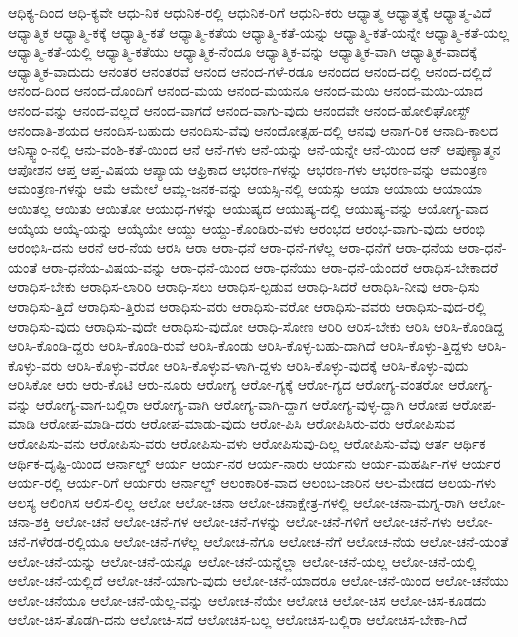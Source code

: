 {ಆಧಿಕ್ಯ-ದಿಂದ
ಆಧಿ-ಕ್ಯವೇ
ಆಧು-ನಿಕ
ಆಧುನಿಕ-ರಲ್ಲಿ
ಆಧುನಿಕ-ರಿಗೆ
ಆಧುನಿ-ಕರು
ಆಧ್ಯಾತ್ಮ
ಆಧ್ಯಾತ್ಮಕ್ಕೆ
ಆಧ್ಯಾತ್ಮ-ವಿದೆ
ಆಧ್ಯಾತ್ಮಿಕ
ಆಧ್ಯಾತ್ಮಿ-ಕಕ್ಕೆ
ಆಧ್ಯಾತ್ಮಿ-ಕತೆ
ಆಧ್ಯಾತ್ಮಿ-ಕತೆಯ
ಆಧ್ಯಾತ್ಮಿ-ಕತೆ-ಯನ್ನು
ಆಧ್ಯಾತ್ಮಿ-ಕತೆ-ಯನ್ನೇ
ಆಧ್ಯಾತ್ಮಿ-ಕತೆ-ಯಲ್ಲ
ಆಧ್ಯಾತ್ಮಿ-ಕತೆ-ಯಲ್ಲಿ
ಆಧ್ಯಾತ್ಮಿ-ಕತೆಯು
ಆಧ್ಯಾತ್ಮಿಕ-ನೆಂದೂ
ಆಧ್ಯಾತ್ಮಿಕ-ವನ್ನು
ಆಧ್ಯಾತ್ಮಿಕ-ವಾಗಿ
ಆಧ್ಯಾತ್ಮಿಕ-ವಾದಕ್ಕೆ
ಆಧ್ಯಾತ್ಮಿಕ-ವಾದುದು
ಆನಂತರ
ಆನಂತರವೆ
ಆನಂದ
ಆನಂದ-ಗಳೆ-ರಡೂ
ಆನಂದದ
ಆನಂದ-ದಲ್ಲಿ
ಆನಂದ-ದಲ್ಲಿದೆ
ಆನಂದ-ದಿಂದ
ಆನಂದ-ದೊಂದಿಗೆ
ಆನಂದ-ಮಯ
ಆನಂದ-ಮಯನೂ
ಆನಂದ-ಮಯಿ
ಆನಂದ-ಮಯಿ-ಯಾದ
ಆನಂದ-ವನ್ನು
ಆನಂದ-ವಲ್ಲದೆ
ಆನಂದ-ವಾಗದೆ
ಆನಂದ-ವಾಗು-ವುದು
ಆನಂದವೇ
ಆನಂದ-ಹೋಲಿಘೋಸ್ಟ್
ಆನಂದಾತಿ-ಶಯದ
ಆನಂದಿಸ-ಬಹುದು
ಆನಂದಿಸು-ವೆವು
ಆನಂದೋತ್ಸಹ-ದಲ್ಲಿ
ಆನವು
ಆನಾಗ-ರಿಕ
ಆನಾದಿ-ಕಾಲದ
ಆನಿಸ್ಕ್ವಾಂ-ನಲ್ಲಿ
ಆನು-ವಂಶಿ-ಕತೆ-ಯಿಂದ
ಆನೆ
ಆನೆ-ಗಳು
ಆನೆ-ಯನ್ನು
ಆನೆ-ಯನ್ನೇ
ಆನೆ-ಯಿಂದ
ಆನ್
ಆಪುಣ್ಯಾತ್ಮನ
ಆಪೋಶನ
ಆಪ್ತ
ಆಪ್ತ-ವಿಷಯ
ಆಪ್ಯಾಯ
ಆಫ್ರಿಕಾದ
ಆಭರಣ-ಗಳನ್ನು
ಆಭರಣ-ಗಳು
ಆಭರಣ-ವನ್ನು
ಆಮಂತ್ರಣ
ಆಮಂತ್ರಣ-ಗಳನ್ನು
ಆಮೆ
ಆಮೇಲೆ
ಆಮ್ಲ-ಜನಕ-ವನ್ನು
ಆಯಸ್ಸಿ-ನಲ್ಲಿ
ಆಯಸ್ಸು
ಆಯಾ
ಆಯಾಯ
ಆಯಾಯಾ
ಆಯಿತಲ್ಲ
ಆಯಿತು
ಆಯಿತೋ
ಆಯುಧ-ಗಳನ್ನು
ಆಯುಷ್ಯದ
ಆಯುಷ್ಯ-ದಲ್ಲಿ
ಆಯುಷ್ಯ-ವನ್ನು
ಆಯೋಗ್ಯ-ವಾದ
ಆಯ್ಕೆಯ
ಆಯ್ಕೆ-ಯನ್ನು
ಆಯ್ಕೆಯೇ
ಆಯ್ದು
ಆಯ್ದು-ಕೊಂಡಿರು-ವಳು
ಆರಂಭದ
ಆರಂಭ-ವಾಗು-ವುದು
ಆರಂಭಿ
ಆರಂಭಿಸಿ-ದನು
ಆರನೆ
ಆರ-ನೆಯ
ಆರಸಿ
ಆರಾ
ಆರಾ-ಧನೆ
ಆರಾ-ಧನೆ-ಗಳೆಲ್ಲ
ಆರಾ-ಧನೆಗೆ
ಆರಾ-ಧನೆಯ
ಆರಾ-ಧನೆ-ಯಂತೆ
ಆರಾ-ಧನೆಯ-ವಿಷಯ-ವನ್ನು
ಆರಾ-ಧನೆ-ಯಿಂದ
ಆರಾ-ಧನೆಯು
ಆರಾ-ಧನೆ-ಯೆಂದರೆ
ಆರಾಧಿಸ-ಬೇಕಾದರೆ
ಆರಾಧಿಸ-ಬೇಕು
ಆರಾಧಿಸ-ಲಾರಿರಿ
ಆರಾಧಿ-ಸಲು
ಆರಾಧಿಸ-ಲ್ಪಡುವ
ಆರಾಧಿ-ಸಿದರೆ
ಆರಾಧಿಸಿ-ನೀವು
ಆರಾ-ಧಿಸು
ಆರಾಧಿಸು-ತ್ತಿದೆ
ಆರಾಧಿಸು-ತ್ತಿರುವ
ಆರಾಧಿಸು-ವರು
ಆರಾಧಿಸು-ವರೋ
ಆರಾಧಿಸು-ವವರು
ಆರಾಧಿಸು-ವುದ-ರಲ್ಲಿ
ಆರಾಧಿಸು-ವುದು
ಆರಾಧಿಸು-ವುದೇ
ಆರಾಧಿಸು-ವುದೋ
ಆರಾಧಿ-ಸೋಣ
ಆರಿರಿ
ಆರಿಸ-ಬೇಕು
ಆರಿಸಿ
ಆರಿಸಿ-ಕೊಂಡಿದ್ದ
ಆರಿಸಿ-ಕೊಂಡಿ-ದ್ದರು
ಆರಿಸಿ-ಕೊಂಡಿ-ರುವೆ
ಆರಿಸಿ-ಕೊಂಡು
ಆರಿಸಿ-ಕೊಳ್ಳ-ಬಹು-ದಾಗಿದೆ
ಆರಿಸಿ-ಕೊಳ್ಳು-ತ್ತಿದ್ದಳು
ಆರಿಸಿ-ಕೊಳ್ಳು-ವರು
ಆರಿಸಿ-ಕೊಳ್ಳು-ವರೋ
ಆರಿಸಿ-ಕೊಳ್ಳುವ-ಳಾಗಿ-ದ್ದಳು
ಆರಿಸಿ-ಕೊಳ್ಳು-ವುದಕ್ಕೆ
ಆರಿಸಿ-ಕೊಳ್ಳು-ವುದು
ಆರಿಸಿಕೋ
ಆರು
ಆರು-ಕೊಟಿ
ಆರು-ನೂರು
ಆರೋಗ್ಯ
ಆರೋ-ಗ್ಯಕ್ಕೆ
ಆರೋ-ಗ್ಯದ
ಆರೋಗ್ಯ-ವಂತರೋ
ಆರೋಗ್ಯ-ವನ್ನು
ಆರೋಗ್ಯ-ವಾಗ-ಬಲ್ಲಿರಾ
ಆರೋಗ್ಯ-ವಾಗಿ
ಆರೋಗ್ಯ-ವಾಗಿ-ದ್ದಾಗ
ಆರೋಗ್ಯ-ವುಳ್ಳ-ದ್ದಾಗಿ
ಆರೋಪ
ಆರೋಪ-ಮಾಡಿ
ಆರೋಪ-ಮಾಡಿ-ದರು
ಆರೋಪ-ಮಾಡು-ವುದು
ಆರೋ-ಪಿಸಿ
ಆರೋಪಿಸಿರು-ವರು
ಆರೋಪಿಸುವ
ಆರೋಪಿಸು-ವನು
ಆರೋಪಿಸು-ವರು
ಆರೋಪಿಸು-ವಳು
ಆರೋಪಿಸುವು-ದಿಲ್ಲ
ಆರೋಪಿಸು-ವೆವು
ಆರ್ತ
ಆರ್ಥಿಕ
ಆರ್ಥಿಕ-ದೃಷ್ಟಿ-ಯಿಂದ
ಆರ್ನಾಲ್ಡ್
ಆರ್ಯ
ಆರ್ಯ-ನರ
ಆರ್ಯ-ನಾರು
ಆರ್ಯನು
ಆರ್ಯ-ಮಹರ್ಷಿ-ಗಳ
ಆರ್ಯರ
ಆರ್ಯ-ರಲ್ಲಿ
ಆರ್ಯ-ರಿಗೆ
ಆರ್ಯರು
ಆರ್ನಾಲ್ಡ್
ಆಲಂಕಾರಿಕ-ವಾದ
ಆಲಂಬ-ಜಾರಿನ
ಆಲ-ಮೇಡದ
ಆಲಯ-ಗಳು
ಆಲಸ್ಯ
ಆಲಿಂಗಿಸ
ಆಲಿಸ-ಲಿಲ್ಲ
ಆಲೋ
ಆಲೋ-ಚನಾ
ಆಲೋ-ಚನಾಕ್ಷೇತ್ರ-ಗಳಲ್ಲಿ
ಆಲೋ-ಚನಾ-ಮಗ್ನ-ರಾಗಿ
ಆಲೋ-ಚನಾ-ಶಕ್ತಿ
ಆಲೋ-ಚನೆ
ಆಲೋ-ಚನೆ-ಗಳ
ಆಲೋ-ಚನೆ-ಗಳನ್ನು
ಆಲೋ-ಚನೆ-ಗಳಿಗೆ
ಆಲೋ-ಚನೆ-ಗಳು
ಆಲೋ-ಚನೆ-ಗಳೆರಡ-ರಲ್ಲಿಯೂ
ಆಲೋ-ಚನೆ-ಗಳೆಲ್ಲ
ಆಲೋಚ-ನೆಗೂ
ಆಲೋಚ-ನೆಗೆ
ಆಲೋಚ-ನೆಯ
ಆಲೋ-ಚನೆ-ಯಂತೆ
ಆಲೋ-ಚನೆ-ಯನ್ನು
ಆಲೋ-ಚನೆ-ಯನ್ನೂ
ಆಲೋ-ಚನೆ-ಯನ್ನೆಲ್ಲಾ
ಆಲೋ-ಚನೆ-ಯಲ್ಲ
ಆಲೋ-ಚನೆ-ಯಲ್ಲಿ
ಆಲೋ-ಚನೆ-ಯಲ್ಲಿದೆ
ಆಲೋ-ಚನೆ-ಯಾಗು-ವುದು
ಆಲೋ-ಚನೆ-ಯಾದರೂ
ಆಲೋ-ಚನೆ-ಯಿಂದ
ಆಲೋ-ಚನೆಯು
ಆಲೋ-ಚನೆಯೂ
ಆಲೋ-ಚನೆ-ಯೆಲ್ಲ-ವನ್ನು
ಆಲೋಚ-ನೆಯೇ
ಆಲೋಚಿ
ಆಲೋ-ಚಿಸ
ಆಲೋ-ಚಿಸ-ಕೂಡದು
ಆಲೋ-ಚಿಸ-ತೊಡಗಿ-ದನು
ಆಲೋಚಿ-ಸದೆ
ಆಲೋಚಿಸ-ಬಲ್ಲ
ಆಲೋಚಿಸ-ಬಲ್ಲಿರಾ
ಆಲೋಚಿಸ-ಬೇಕಾ-ಗಿದೆ
}
